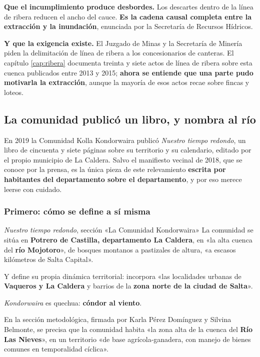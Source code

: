\textbf{Que el incumplimiento produce desbordes.} Los descartes dentro de la línea de ribera
reducen el ancho del cauce. \textbf{Es la cadena causal completa entre la extracción y la
inundación}, enunciada por la Secretaría de Recursos Hídricos.

\textbf{Y que la exigencia existe.} El Juzgado de Minas y la Secretaría de Minería piden la
delimitación de línea de ribera a los concesionarios de canteras. El capítulo \ref{cap:ribera} documenta
treinta y siete actos de línea de ribera sobre esta cuenca publicados entre 2013 y 2015; \textbf{ahora se entiende que una parte pudo motivarla la extracción}, aunque la mayoría de esos actos recae sobre fincas y loteos.

\subsection*{La comunidad publicó un libro, y nombra al río}

En 2019 la Comunidad Kolla Kondorwaira publicó \textit{Nuestro tiempo redondo}, un libro de
cincuenta y siete páginas sobre su territorio y su calendario, editado por el propio
municipio de La Caldera. Salvo el manifiesto vecinal de 2018, que se conoce por la prensa, es la única pieza de este relevamiento \textbf{escrita por habitantes
del departamento sobre el departamento}, y por eso merece leerse con cuidado.

\subsubsection*{Primero: cómo se define a sí misma}

\begin{ficha}{\textit{Nuestro tiempo redondo}, sección «La Comunidad Kondorwaira»}
La comunidad se sitúa en \textbf{Potrero de Castilla, departamento La Caldera}, en «la alta
cuenca del \textbf{río Mojotoro}», de bosques montanos a pastizales de altura, «a escasos
kilómetros de Salta Capital».

Y define su propia dinámica territorial: incorpora «las localidades urbanas de
\textbf{Vaqueros y La Caldera} y barrios de la \textbf{zona norte de la ciudad de Salta}».

\textit{Kondorwaira} es quechua: \textbf{cóndor al viento}.

En la sección metodológica, firmada por Karla Pérez Domínguez y Silvina Belmonte, se precisa
que la comunidad habita «la zona alta de la cuenca del \textbf{Río Las Nieves}», en un
territorio «de base agrícola-ganadera, con manejo de bienes comunes en temporalidad cíclica».
\end{ficha}

